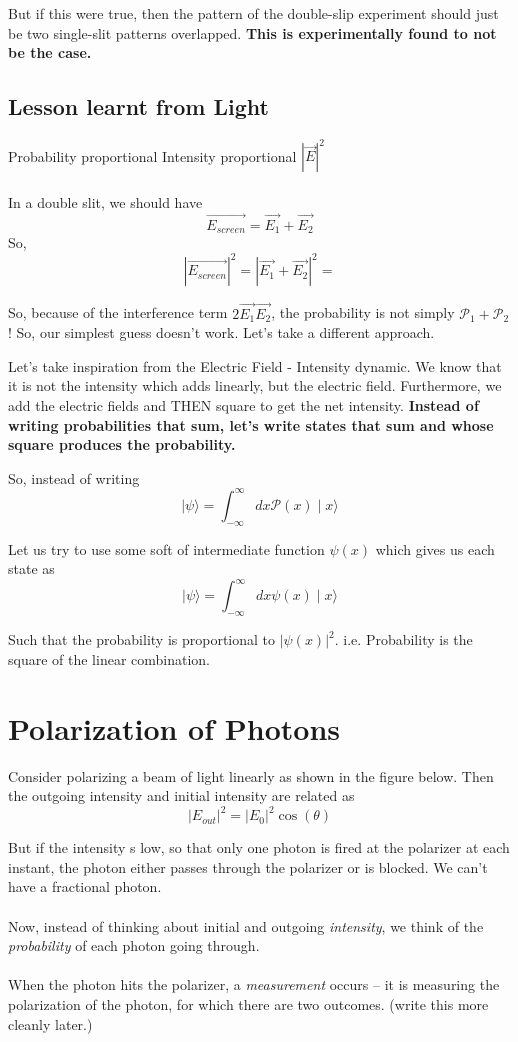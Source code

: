 \documentclass[twoside]{article}
\begin{document}
But if this were true, then the pattern of the double-slip experiment should just be two single-slit patterns overlapped. \textbf{This is experimentally found to not be the case.}

\subsection*{Lesson learnt from Light}
Probability proportional Intensity proportional $|\vec{E}|^2$
\\
\\
In a double slit, we should have 
\[ \vec{E_{screen}} = \vec{E_{1}} + \vec{E_{2}} \] 
So,
\[  |\vec{E_{screen}}|^2 = |\vec{E_{1}} + \vec{E_{2}}|^2 = \]

So, because of the interference term $2\vec{E_1}\vec{E_2}$, the probability is not simply $\mathcal{P_1} + \mathcal{P_2}$! So, our simplest guess doesn't work. Let's take a different approach.

Let's take inspiration from the Electric Field - Intensity dynamic.
We know that it is not the intensity which adds linearly, but the electric field. Furthermore, we add the electric fields and THEN square to get the net intensity. \textbf{Instead of writing probabilities that sum, let's write states that sum and whose square produces the probability.}

So, instead of writing 
\[ \mid \psi \rangle = \int_{-\infty}^{\infty} dx \mathcal{P}(x)\mid x \rangle  \]

Let us try to use some soft of intermediate function $\psi(x)$ which gives us each state as 
\[ \mid \psi \rangle = \int_{-\infty}^{\infty} dx  \psi(x) \mid x \rangle \]

Such that the probability is proportional to $|\psi(x)|^2$. i.e. Probability is the square of the linear combination.

\section{Polarization of Photons}
Consider polarizing a beam of light linearly as shown in the figure below. Then the outgoing intensity and initial intensity are related as 
\[ |E_{out}|^2 = |E_0|^2\cos(\theta) \]

But if the intensity s low, so that only one photon is fired at the polarizer at each instant, the photon either passes through the polarizer or is blocked. We can't have a fractional photon.
\\
\\
Now, instead of thinking about initial and outgoing \emph{intensity}, we think of the \emph{probability} of each photon going through.
\\
\\
When the photon hits the polarizer, a \emph{measurement} occurs -- it is measuring the polarization of the photon, for which there are two outcomes.
(write this more cleanly later.)
\end{document}
